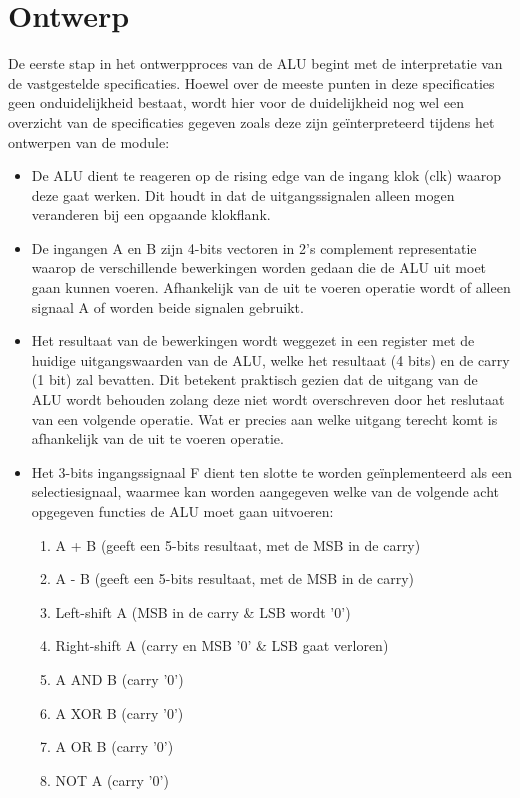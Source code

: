 \documentclass[11pt,twoside,a4paper]{article}
\newenvironment{myitemize}
{ \begin{itemize}[topsep=1ex]
    \setlength{\itemsep}{5pt}
    \setlength{\parskip}{5pt}
    \setlength{\parsep}{5pt}     }
{ \end{itemize}                  }
\begin{document}
\section{Ontwerp}
De eerste stap in het ontwerpproces van de ALU begint met de interpretatie van de vastgestelde specificaties. Hoewel over de meeste punten in deze specificaties geen onduidelijkheid bestaat, wordt hier voor de duidelijkheid nog wel een overzicht van de specificaties gegeven zoals deze zijn ge\"interpreteerd tijdens het ontwerpen van de module:
\begin{myitemize}
\item De ALU dient te reageren op de rising edge van de ingang klok (clk) waarop deze gaat werken. Dit houdt in dat de uitgangssignalen alleen mogen veranderen bij een opgaande klokflank.
\item De ingangen A en B zijn 4-bits vectoren in 2's complement representatie waarop de verschillende bewerkingen worden gedaan die de ALU uit moet gaan kunnen voeren. Afhankelijk van de uit te voeren operatie wordt of alleen signaal A of worden beide signalen gebruikt.
\item Het resultaat van de bewerkingen wordt weggezet in een register met de huidige uitgangswaarden van de ALU, welke het resultaat (4 bits) en de carry (1 bit) zal bevatten. Dit betekent praktisch gezien dat de uitgang van de ALU wordt behouden zolang deze niet wordt overschreven door het reslutaat van een volgende operatie. Wat er precies aan welke uitgang terecht komt is afhankelijk van de uit te voeren operatie.
\item Het 3-bits ingangssignaal F dient ten slotte te worden ge\"inplementeerd als een selectiesignaal, waarmee kan worden aangegeven welke van de volgende acht opgegeven functies de ALU moet gaan uitvoeren:
\begin{enumerate}
\item A + B (geeft een 5-bits resultaat, met de MSB in de carry)
\item A - B (geeft een 5-bits resultaat, met de MSB in de carry)
\item Left-shift A (MSB in de carry \& LSB wordt '0')
\item Right-shift A (carry en MSB '0' \& LSB gaat verloren)
\item A AND B (carry '0')
\item A XOR B (carry '0')
\item A OR B (carry '0')
\item NOT A (carry '0')
\end{enumerate}

\end{myitemize}
\end{document}
